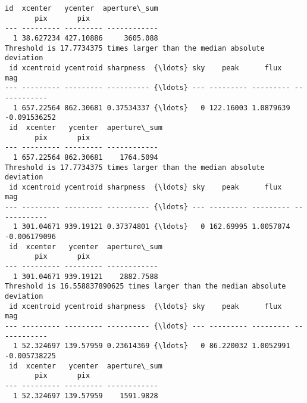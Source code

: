 \documentclass[11pt]{article}
\begin{document}
\begin{Verbatim}[commandchars=\\\{\}]
 id  xcenter   ycenter  aperture\_sum
       pix       pix
--- --------- --------- ------------
  1 38.627234 427.10886     3605.088
Threshold is 17.7734375 times larger than the median absolute deviation
 id xcentroid ycentroid sharpness  {\ldots} sky    peak      flux       mag
--- --------- --------- ---------- {\ldots} --- --------- --------- ------------
  1 657.22564 862.30681 0.37534337 {\ldots}   0 122.16003 1.0879639 -0.091536252
 id  xcenter   ycenter  aperture\_sum
       pix       pix
--- --------- --------- ------------
  1 657.22564 862.30681    1764.5094
Threshold is 17.7734375 times larger than the median absolute deviation
 id xcentroid ycentroid sharpness  {\ldots} sky    peak      flux       mag
--- --------- --------- ---------- {\ldots} --- --------- --------- ------------
  1 301.04671 939.19121 0.37374801 {\ldots}   0 162.69995 1.0057074 -0.006179096
 id  xcenter   ycenter  aperture\_sum
       pix       pix
--- --------- --------- ------------
  1 301.04671 939.19121    2882.7588
Threshold is 16.558837890625 times larger than the median absolute deviation
 id xcentroid ycentroid sharpness  {\ldots} sky    peak      flux       mag
--- --------- --------- ---------- {\ldots} --- --------- --------- ------------
  1 52.324697 139.57959 0.23614369 {\ldots}   0 86.220032 1.0052991 -0.005738225
 id  xcenter   ycenter  aperture\_sum
       pix       pix
--- --------- --------- ------------
  1 52.324697 139.57959    1591.9828
    \end{Verbatim}

    \begin{center}
    \end{center}
    { \hspace*{\fill} \\}
    
\end{document}
